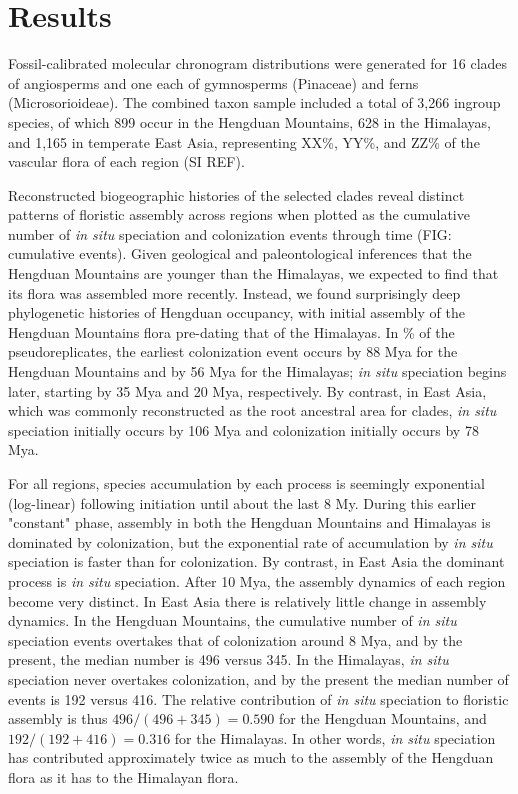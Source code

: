 \section{Results}

Fossil-calibrated molecular chronogram distributions were generated for 16 clades of angiosperms and one each of gymnosperms (Pinaceae) and ferns (Microsorioideae). The combined taxon sample included a total of 3,266 ingroup species, of which 899 occur in the Hengduan Mountains, 628 in the Himalayas, and 1,165 in temperate East Asia, representing XX\%, YY\%, and ZZ\% of the vascular flora of each region (SI REF).

Reconstructed biogeographic histories of the selected clades reveal distinct patterns of floristic assembly across regions when plotted as the cumulative number of \textit{in situ} speciation and colonization events through time (FIG: cumulative events). Given geological and paleontological inferences that the Hengduan Mountains are younger than the Himalayas, we expected to find that its flora was assembled more recently. Instead, we found surprisingly deep phylogenetic histories of Hengduan occupancy, with initial assembly of the Hengduan Mountains flora pre-dating that of the Himalayas. In \% of the pseudoreplicates, the earliest colonization event occurs by 88 Mya for the Hengduan Mountains and by 56 Mya for the Himalayas; \textit{in situ} speciation begins later, starting by 35 Mya and 20 Mya, respectively. By contrast, in East Asia, which was commonly reconstructed as the root ancestral area for clades, \textit{in situ} speciation initially occurs by 106 Mya and colonization initially occurs by 78 Mya.

For all regions, species accumulation by each process is seemingly exponential (log-linear) following initiation until about the last 8 My. During this earlier "constant" phase, assembly in both the Hengduan Mountains and Himalayas is dominated by colonization, but the exponential rate of accumulation by \textit{in situ} speciation is faster than for colonization. By contrast, in East Asia the dominant process is \textit{in situ} speciation.  After 10 Mya, the assembly dynamics of each region become very distinct. In East Asia there is relatively little change in assembly dynamics. In the Hengduan Mountains, the cumulative number of \textit{in situ} speciation events overtakes that of colonization around 8 Mya, and by the present, the median number is 496 versus 345. In the Himalayas, \textit{in situ} speciation never overtakes colonization, and by the present the median number of events is 192 versus 416. The relative contribution of \textit{in situ} speciation to floristic assembly is thus $496/(496+345) = 0.590$ for the Hengduan Mountains, and $192/(192+416) = 0.316$ for the Himalayas. In other words, \textit{in situ} speciation has contributed approximately twice as much to the assembly of the Hengduan flora as it has to the Himalayan flora.

